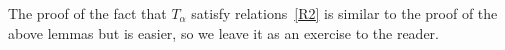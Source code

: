 \documentclass[oneside, 11pt]{amsart} \pdfoutput=1
\numberwithin{equation}{section}
\theoremstyle{definition}
\begin{document}
\begin{comment}
\theta'''_0\bigl(x_{\alpha + \beta}\bigl(N_{\alpha \beta} (aa' h^n + ab' + a'b) h^{n - 2s}\bigr)\bigr)\, \theta''_0(x_\beta(a'h^{n-s}))\, \theta_0(x_\alpha(ah^{n - s}))\, v\bigr),
\end{multline*}
where $\theta''$ is a strict representative of $\Xi\bigl(x_\alpha(\frac b {h^s})\, \iota(u)\bigr)^{-1}$, $\theta'''$ is a strict representative of $\Xi\bigl(x_\beta(\frac{b'}{h^s})\, x_\alpha(\frac b{h^s})\, \iota(u)\bigr)^{-1}$, and $\theta^{\mathrm{IV}}$ is a strict representative of $\Xi\bigl(x_{\alpha + \beta}(N_{\alpha \beta}\frac{bb'}{h^{2s}})\, x_\beta(\frac{b'}{h^s})\, x_\alpha(\frac b{h^s})\, \iota(u)\bigr)^{-1}$. We may choose $\theta''$, $\theta'''$, $\theta^{\mathrm{IV}}$ in such a way that
$$
\theta''_0(x_\beta(a' h^{n - s})) = \theta_0\bigl(x_{\alpha + 2\beta}(-N_{\alpha \beta 1 2} {a'}^2 bh^{2n - 3s})\, x_{\alpha + \beta}(-N_{\alpha \beta} a'bh^{n - 2s})\, x_\beta(a'h^{n - s})\bigr),
$$
\begin{multline*}
\theta'''_0\bigl(x_{\alpha + \beta}\bigl(N_{\alpha \beta} (aa'h^n + ab' + a'b) h^{n - 2s}\bigr)\bigr)\\
= \theta_0\bigl(x_{\alpha + 2\beta}(-N_{\beta, \alpha + \beta} N_{\alpha \beta} (aa'h^n + ab' + a'b) b' h^{n - 3s})\, x_{\alpha + \beta}\bigl(N_{\alpha \beta} (aa'h^n + ab' + a'b) h^{n - 2s}\bigr)\bigr),
\end{multline*}
and
\begin{multline*}
\theta^{\mathrm{IV}}_0\bigl(x_{\alpha + 2\beta}(N_{\alpha \beta 12} (a{a'}^2 h^{2n} + 2aa'b' h^n + {a'}^2 bh^n + 2a'bb' + a{b'}^2) h^{n - 3s})\bigr)\\
= \theta_0\bigl(x_{\alpha + 2\beta}(N_{\alpha \beta 12} (a{a'}^2 h^{2n} + 2aa'b' + {a'}^2 bh^n + 2a'bb' + a{b'}^2) h^{n - 3s})\bigr).
\end{multline*}
It remains to check that
\begin{multline*}
x_\alpha(ah^{n - s})\, x_{\alpha + \beta}(N_{\alpha\beta} ab'h^{n - 2s})\, x_{\alpha + 2\beta}(-N_{\alpha\beta 12} a{b'}^2 h^{n - 3s})\, x_\beta(a' h^{n - s})\\
= x_{\alpha + 2\beta}(N_{\alpha \beta 12} (a{a'}^2 h^{2n} + 2aa'b' h^n + 2a'bb' + a{b'}^2) h^{n - 3s} - N_{\beta, \alpha + \beta} N_{\alpha \beta} (aa'h^n + ab' + a'b) b' h^{n - 3s})\\
x_{\alpha + \beta}\bigl(N_{\alpha \beta} (aa'h^n + ab' + a'b) h^{n - 2s}\bigr)\, x_{\alpha + \beta}(-N_{\alpha \beta} a'bh^{n - 2s})\, x_\beta(a'h^{n - s})\, x_\alpha(ah^{n - s}).
\end{multline*}
This follows from the Steinberg relations and the identity \(N_{\beta, \alpha + \beta} N_{\alpha \beta} = 2 N_{\alpha \beta 1 2}\).
\end{comment} 
The proof of the fact that $T_\alpha$ satisfy relations~\eqref{R2} is similar to the proof of the above lemmas but is easier, so we leave it as an exercise to the reader.
\end{document}
